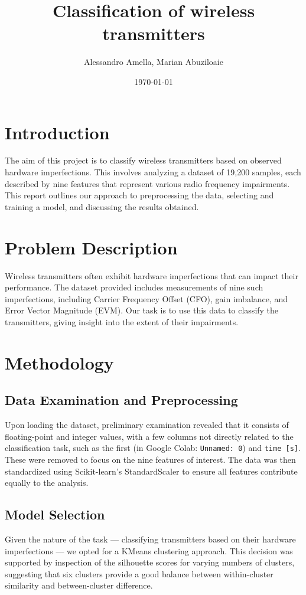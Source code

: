\documentclass{article}
\title{Classification of wireless transmitters}
\author{Alessandro Amella, Marian Abuziloaie}
\date{\today}
\begin{document}
\maketitle




\section{Introduction}
The aim of this project is to classify wireless transmitters based on observed hardware imperfections. This involves analyzing a dataset of 19,200 samples, each described by nine features that represent various radio frequency impairments. This report outlines our approach to preprocessing the data, selecting and training a model, and discussing the results obtained.

\section{Problem Description}
Wireless transmitters often exhibit hardware imperfections that can impact their performance. The dataset provided includes measurements of nine such imperfections, including Carrier Frequency Offset (CFO), gain imbalance, and Error Vector Magnitude (EVM). Our task is to use this data to classify the transmitters, giving insight into the extent of their impairments.

\section{Methodology}

\subsection{Data Examination and Preprocessing}
Upon loading the dataset, preliminary examination revealed that it consists of floating-point and integer values, with a few columns not directly related to the classification task, such as the first (in Google Colab: \texttt{Unnamed: 0}) and \texttt{time [s]}. These were removed to focus on the nine features of interest. The data was then standardized using Scikit-learn's StandardScaler to ensure all features contribute equally to the analysis.

\subsection{Model Selection}
Given the nature of the task — classifying transmitters based on their hardware imperfections — we opted for a KMeans clustering approach. This decision was supported by inspection of the silhouette scores for varying numbers of clusters, suggesting that six clusters provide a good balance between within-cluster similarity and between-cluster difference.
\end{document}
